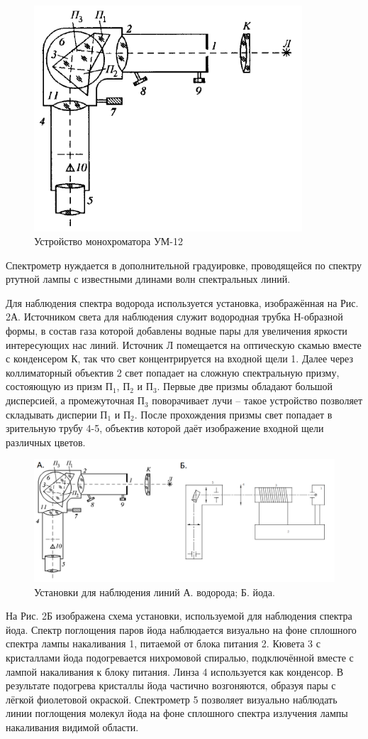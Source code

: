 \documentclass[a4paper,12pt]{report}
\begin{document}
\begin{figure}[h]
    \centering
    \includegraphics[width=10cm]{fig2.PNG}
    \caption{Устройство монохроматора УМ-12}
    \label{fig:vac}
\end{figure}

Спектрометр нуждается в дополнительной градуировке, проводящейся по спектру ртутной лампы с известными длинами волн спектральных линий.

Для наблюдения спектра водорода используется установка, изображённая на Рис. 2А. Источником света для наблюдения служит водородная трубка Н-образной формы, в состав газа которой добавлены водные пары для увеличения яркости интересующих нас линий. Источник Л помещается на оптическую скамью вместе с конденсером К, так что свет концентрируется на входной щели 1. Далее через коллиматорный объектив 2 свет попадает на сложную спектральную призму, состояющую из призм П$_1$, П$_2$ и П$_3$. Первые две призмы обладают большой дисперсией, а промежуточная П$_3$ поворачивает лучи -- такое устройство позволяет складывать дисперии П$_1$ и П$_2$. После прохождения призмы свет попадает в зрительную трубу 4-5, объектив которой даёт изображение входной щели различных цветов.
\begin{figure}[h]
\includegraphics[scale=0.5]{2.png}
\centering
\caption{Установки для наблюдения линий А. водорода; Б. йода.}
\end{figure} 
На Рис. 2Б изображена схема установки, используемой для наблюдения спектра йода. Спектр поглощения паров йода наблюдается визуально на фоне сплошного спектра лампы накаливания 1, питаемой от блока питания 2. Кювета 3 с кристаллами йода подогревается нихромовой спиралью, подключённой вместе с лампой накаливания к блоку питания. Линза 4 используется как конденсор. В результате подогрева кристаллы йода частично возгоняются, образуя пары
с лёгкой фиолетовой окраской. Спектрометр 5 позволяет визуально наблюдать линии поглощения молекул йода на фоне сплошного спектра излучения лампы накаливания видимой области.
\end{document}
